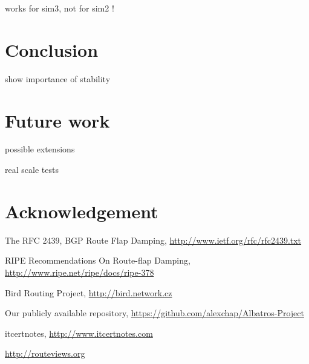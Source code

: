 \documentclass[a4paper,english]{IEEEtran}
\begin{document}
works for sim3, not for sim2 !


\section{Conclusion}

show importance of stability


\section{Future work}

possible extensions

real scale tests


\section{Acknowledgement}

\begin{thebibliography}{6}

The RFC 2439, BGP Route Flap Damping, \href{http://www.ietf.org/rfc/rfc2439.txt}{http://www.ietf.org/rfc/rfc2439.txt}

 RIPE Recommendations On Route-flap
Damping, \href{http://www.ripe.net/ripe/docs/ripe-378}{http://www.ripe.net/ripe/docs/ripe-378}

Bird Routing Project, \href{http://bird.network.cz}{http://bird.network.cz}

Our publicly available repository, \href{https://github.com/alexchap/Albatros-Project}{https://github.com/alexchap/Albatros-Project}

itcertnotes, \href{www.itcertnotes.com}{http://www.itcertnotes.com}

\href{http://routeviews.org}{http://routeviews.org} 

\end{thebibliography}
\end{document}
